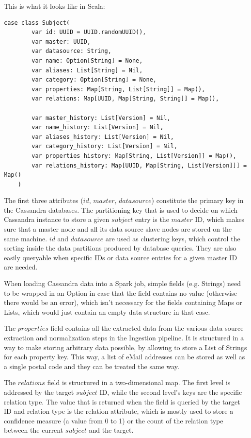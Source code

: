 \documentclass[
        a4paper,     %
        titlepage,   %
        oneside,     %
        parskip      %
]{scrartcl}          %
\begin{document}
    This is what it looks like in Scala:
    \begin{lstlisting}[style=scalaStyle,caption=Subject]
    case class Subject(
    	var id: UUID = UUID.randomUUID(),
    	var master: UUID,
    	var datasource: String,
    	var name: Option[String] = None,
    	var aliases: List[String] = Nil,
    	var category: Option[String] = None,
    	var properties: Map[String, List[String]] = Map(),
    	var relations: Map[UUID, Map[String, String]] = Map(),

    	var master_history: List[Version] = Nil,
    	var name_history: List[Version] = Nil,
    	var aliases_history: List[Version] = Nil,
    	var category_history: List[Version] = Nil,
    	var properties_history: Map[String, List[Version]] = Map(),
    	var relations_history: Map[UUID, Map[String, List[Version]]] = Map()
    )
    \end{lstlisting}

    The first three attributes ($id$, $master$, $datasource$) constitute the
    primary key in the Cassandra databases.
    The partitioning key that is used to decide on which Cassandra instance to store
    a given $subject$ entry is the $master$ ID, which makes sure that a master node
    and all its data source slave nodes are stored on the same machine.
    $id$ and $datasource$ are used as clustering keys, which control the sorting
    inside the data partitions produced by database queries. They are also easily
    queryable when specific IDs or data source entries for a given master ID are
    needed.

    When loading Cassandra data into a Spark job, simple fields (e.g. Strings)
    need to be wrapped in an Option in case that the field contains no value
    (otherwise there would be an error), which isn't necessary for the fields
    containing Maps or Lists, which would just contain an empty data structure
    in that case.

    The $properties$ field contains all the extracted data from the various
    data source extraction and normalization steps in the Ingestion pipeline.
    It is structured in a way to make storing arbitrary data possible, by allowing
    to store a List of Strings for each property key. This way, a list of
    eMail addresses can be stored as well as a single postal code and they can
    be treated the same way.

    The $relations$ field is structured in a two-dimensional map. The first level
    is addressed by the target $subject$ ID, while the second level's keys are the
    specific relation type. The value that is returned when the field is queried
    by the target ID and relation type is the relation attribute, which is mostly
    used to store a confidence measure (a value from 0 to 1) or the count of the
    relation type between the current $subject$ and the target.
\end{document}
